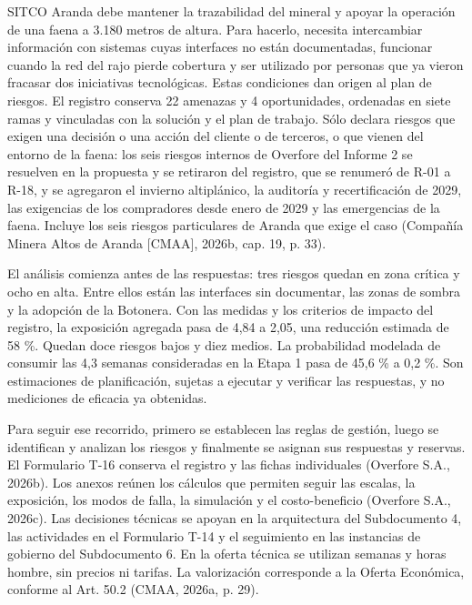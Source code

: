 \documentclass[subdoc]{../../comun/overfore}
\begin{document}
SITCO Aranda debe mantener la trazabilidad del mineral y apoyar la operación de una faena a 3.180 metros de altura. Para hacerlo, necesita intercambiar información con sistemas cuyas interfaces no están documentadas, funcionar cuando la red del rajo pierde cobertura y ser utilizado por personas que ya vieron fracasar dos iniciativas tecnológicas. Estas condiciones dan origen al plan de riesgos. El registro conserva 22 amenazas y 4 oportunidades, ordenadas en siete ramas y vinculadas con la solución y el plan de trabajo. Sólo declara riesgos que exigen una decisión o una acción del cliente o de terceros, o que vienen del entorno de la faena: los seis riesgos internos de Overfore del Informe 2 se resuelven en la propuesta y se retiraron del registro, que se renumeró de R-01 a R-18, y se agregaron el invierno altiplánico, la auditoría y recertificación de 2029, las exigencias de los compradores desde enero de 2029 y las emergencias de la faena. Incluye los seis riesgos particulares de Aranda que exige el caso (Compañía Minera Altos de Aranda [CMAA], 2026b, cap. 19, p. 33).

El análisis comienza antes de las respuestas: tres riesgos quedan en zona crítica y ocho en alta. Entre ellos están las interfaces sin documentar, las zonas de sombra y la adopción de la Botonera. Con las medidas y los criterios de impacto del registro, la exposición agregada pasa de 4,84 a 2,05, una reducción estimada de 58 \%. Quedan doce riesgos bajos y diez medios. La probabilidad modelada de consumir las 4,3 semanas consideradas en la Etapa 1 pasa de 45,6 \% a 0,2 \%. Son estimaciones de planificación, sujetas a ejecutar y verificar las respuestas, y no mediciones de eficacia ya obtenidas.

Para seguir ese recorrido, primero se establecen las reglas de gestión, luego se identifican y analizan los riesgos y finalmente se asignan sus respuestas y reservas. El Formulario T-16 conserva el registro y las fichas individuales (Overfore S.A., 2026b). Los anexos reúnen los cálculos que permiten seguir las escalas, la exposición, los modos de falla, la simulación y el costo-beneficio (Overfore S.A., 2026c). Las decisiones técnicas se apoyan en la arquitectura del Subdocumento 4, las actividades en el Formulario T-14 y el seguimiento en las instancias de gobierno del Subdocumento 6. En la oferta técnica se utilizan semanas y horas hombre, sin precios ni tarifas. La valorización corresponde a la Oferta Económica, conforme al Art. 50.2 (CMAA, 2026a, p. 29).
\end{document}
